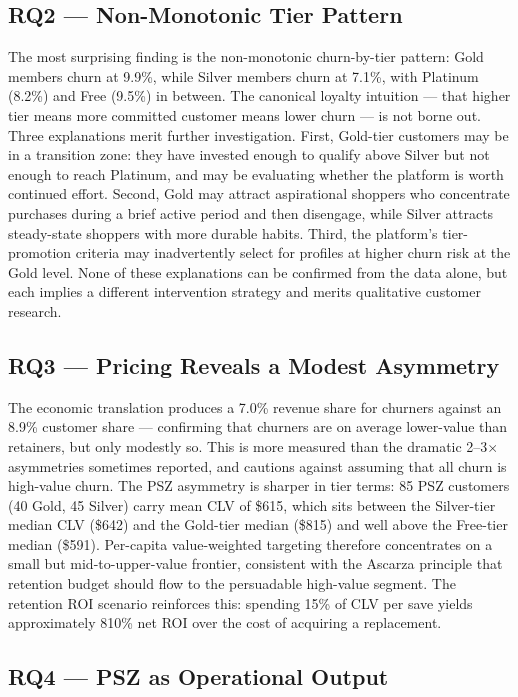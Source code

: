 \documentclass[conference]{IEEEtran}
\begin{document}
\subsection{RQ2 — Non-Monotonic Tier Pattern}

The most surprising finding is the non-monotonic churn-by-tier pattern: Gold members churn at 9.9\%, while Silver members churn at 7.1\%, with Platinum (8.2\%) and Free (9.5\%) in between. The canonical loyalty intuition — that higher tier means more committed customer means lower churn — is not borne out. Three explanations merit further investigation. First, Gold-tier customers may be in a transition zone: they have invested enough to qualify above Silver but not enough to reach Platinum, and may be evaluating whether the platform is worth continued effort. Second, Gold may attract aspirational shoppers who concentrate purchases during a brief active period and then disengage, while Silver attracts steady-state shoppers with more durable habits. Third, the platform's tier-promotion criteria may inadvertently select for profiles at higher churn risk at the Gold level. None of these explanations can be confirmed from the data alone, but each implies a different intervention strategy and merits qualitative customer research.

\subsection{RQ3 — Pricing Reveals a Modest Asymmetry}

The economic translation produces a 7.0\% revenue share for churners against an 8.9\% customer share — confirming that churners are on average lower-value than retainers, but only modestly so. This is more measured than the dramatic 2--3$\times$ asymmetries sometimes reported, and cautions against assuming that all churn is high-value churn. The PSZ asymmetry is sharper in tier terms: 85 PSZ customers (40 Gold, 45 Silver) carry mean CLV of \$615, which sits between the Silver-tier median CLV (\$642) and the Gold-tier median (\$815) and well above the Free-tier median (\$591). Per-capita value-weighted targeting therefore concentrates on a small but mid-to-upper-value frontier, consistent with the Ascarza \cite{ascarza2018} principle that retention budget should flow to the persuadable high-value segment. The retention ROI scenario reinforces this: spending 15\% of CLV per save yields approximately 810\% net ROI over the cost of acquiring a replacement.

\subsection{RQ4 — PSZ as Operational Output}
\end{document}
